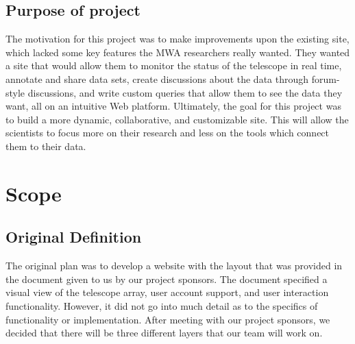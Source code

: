 \documentclass[12pt]{article}
\begin{document}
\begin{spacing}{1.5}
\subsection{Purpose of project}
The motivation for this project was to make improvements upon the existing site, which lacked some key features the MWA researchers really wanted. They wanted a site that would allow them to monitor the status of the telescope in real time, annotate and share data sets, create discussions about the data through forum-style discussions, and write custom queries that allow them to see the data they want, all on an intuitive Web platform. Ultimately, the goal for this project was to build a more dynamic, collaborative, and customizable site. This will allow the scientists to focus more on their research and less on the tools which connect them to their data.

\section{Scope}
\subsection{Original Definition}
The original plan was to develop a website with the layout that was provided in the document given to us by our project sponsors. The document specified a visual view of the telescope array, user account support, and user interaction functionality. However, it did not go into much detail as to the specifics of functionality or implementation. After meeting with our project sponsors, we decided that there will be three different layers that our team will work on.


\end{spacing}
\end{document}
